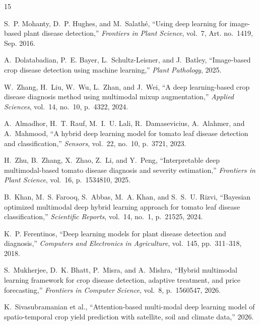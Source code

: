 \documentclass[conference]{IEEEtran}
\begin{document}
\balance
\begin{thebibliography}{15}

S.~P. Mohanty, D.~P. Hughes, and M.~Salath\'{e}, ``Using deep learning for image-based plant disease detection,'' \textit{Frontiers in Plant Science}, vol.~7, Art. no.~1419, Sep. 2016.

A.~Dolatabadian, P.~E. Bayer, L.~Schultz-Leisner, and J.~Batley, ``Image-based crop disease detection using machine learning,'' \textit{Plant Pathology}, 2025.

W.~Zhang, H.~Liu, W.~Wu, L.~Zhan, and J.~Wei, ``A deep learning-based crop disease diagnosis method using multimodal mixup augmentation,'' \textit{Applied Sciences}, vol.~14, no.~10, p.~4322, 2024.

A.~Almadhor, H.~T. Rauf, M.~I.~U. Lali, R.~Damasevicius, A.~Alahmer, and A.~Mahmood, ``A hybrid deep learning model for tomato leaf disease detection and classification,'' \textit{Sensors}, vol.~22, no.~10, p.~3721, 2023.

H.~Zhu, B.~Zhang, X.~Zhao, Z.~Li, and Y.~Peng, ``Interpretable deep multimodal-based tomato disease diagnosis and severity estimation,'' \textit{Frontiers in Plant Science}, vol.~16, p.~1534810, 2025.

B.~Khan, M.~S. Farooq, S.~Abbas, M.~A. Khan, and S.~S.~U. Rizvi, ``Bayesian optimized multimodal deep hybrid learning approach for tomato leaf disease classification,'' \textit{Scientific Reports}, vol.~14, no.~1, p.~21525, 2024.

K.~P. Ferentinos, ``Deep learning models for plant disease detection and diagnosis,'' \textit{Computers and Electronics in Agriculture}, vol.~145, pp.~311--318, 2018.

S.~Mukherjee, D.~K. Bhatt, P.~Misra, and A.~Mishra, ``Hybrid multimodal learning framework for crop disease detection, adaptive treatment, and price forecasting,'' \textit{Frontiers in Computer Science}, vol.~8, p.~1560547, 2026.

K.~Sivasubramanian et al., ``Attention-based multi-modal deep learning model of spatio-temporal crop yield prediction with satellite, soil and climate data,'' 2026.


\end{thebibliography}
\end{document}
